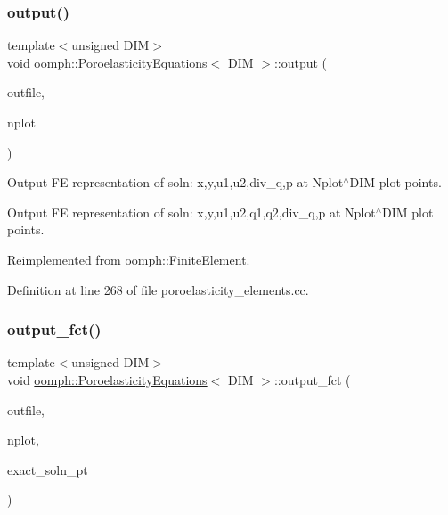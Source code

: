 \subsubsection{\texorpdfstring{output()}{output()}\hspace{0.1cm}{\footnotesize\ttfamily [2/2]}}
{\footnotesize\ttfamily template$<$unsigned D\+IM$>$ \\
void \hyperlink{classoomph_1_1PoroelasticityEquations}{oomph\+::\+Poroelasticity\+Equations}$<$ D\+IM $>$\+::output (\begin{DoxyParamCaption}\item[{std\+::ostream \&}]{outfile,  }\item[{const unsigned \&}]{nplot }\end{DoxyParamCaption})\hspace{0.3cm}{\ttfamily [virtual]}}



Output FE representation of soln\+: x,y,u1,u2,div\+\_\+q,p at Nplot$^\wedge$\+D\+IM plot points. 

Output FE representation of soln\+: x,y,u1,u2,q1,q2,div\+\_\+q,p at Nplot$^\wedge$\+D\+IM plot points. 

Reimplemented from \hyperlink{classoomph_1_1FiniteElement_afa9d9b2670f999b43e6679c9dd28c457}{oomph\+::\+Finite\+Element}.



Definition at line 268 of file poroelasticity\+\_\+elements.\+cc.

\mbox{\label{classoomph_1_1PoroelasticityEquations_a11af50ce3426539de63b8efe57a5fa4c}} 
\subsubsection{\texorpdfstring{output\+\_\+fct()}{output\_fct()}\hspace{0.1cm}{\footnotesize\ttfamily [1/2]}}
{\footnotesize\ttfamily template$<$unsigned D\+IM$>$ \\
void \hyperlink{classoomph_1_1PoroelasticityEquations}{oomph\+::\+Poroelasticity\+Equations}$<$ D\+IM $>$\+::output\+\_\+fct (\begin{DoxyParamCaption}\item[{std\+::ostream \&}]{outfile,  }\item[{const unsigned \&}]{nplot,  }\item[{\hyperlink{classoomph_1_1FiniteElement_a690fd33af26cc3e84f39bba6d5a85202}{Finite\+Element\+::\+Steady\+Exact\+Solution\+Fct\+Pt}}]{exact\+\_\+soln\+\_\+pt }\end{DoxyParamCaption})\hspace{0.3cm}{\ttfamily [virtual]}}




